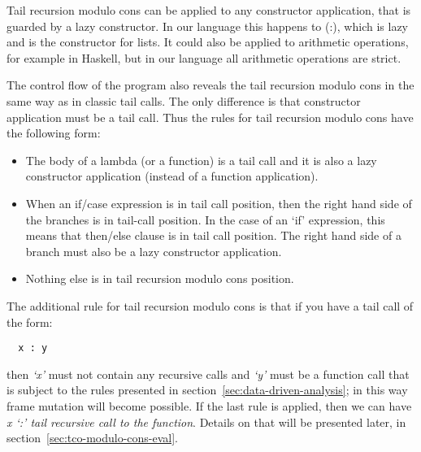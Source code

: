 \documentclass[diploma]{softlab-thesis}
\begin{document}
Tail recursion modulo cons can be applied to any constructor application, that is guarded by a lazy constructor.
In our language this happens to (:), which is lazy and is the constructor for lists. It could also be applied 
to arithmetic operations, for example in Haskell, but in our language all arithmetic operations are strict.

The control flow of the program also reveals the tail recursion modulo cons in the same way as in classic tail 
calls. The only difference is that constructor application must be a tail call. Thus the rules for tail recursion 
modulo cons have the following form:
\begin{itemize} 
  \item The body of a lambda (or a function) is a tail call and it is also a lazy constructor application
  (instead of a function application).
  \item When an if/case expression is in tail call position, then the right hand side of the branches is in tail-call position. 
  In the case of an `if' expression, this means that then/else clause is in tail call position. The right hand side 
  of a branch must also be a lazy constructor application.
  \item Nothing else is in tail recursion modulo cons position.
\end{itemize}


The additional rule for tail recursion modulo cons is that if you have a tail call of the form:
\begin{verbatim}
  x : y
\end{verbatim}
then \textit{`x'} must not contain any recursive calls and \textit{`y'} must be a function call that is subject to the 
rules presented in section~\ref{sec:data-driven-analysis}; in this way frame mutation will become possible. If the last rule is applied, 
then we can have \textit{x `:' tail recursive call to the function}. Details on that will be presented later, in section~\ref{sec:tco-modulo-cons-eval}.


\end{document}
